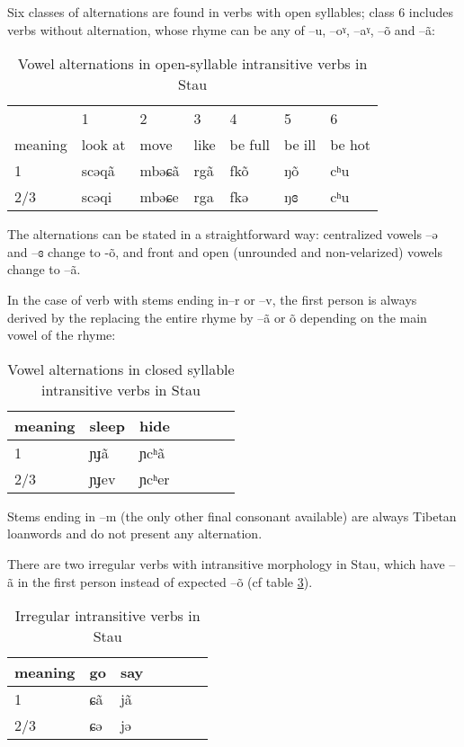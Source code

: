 \documentclass[oldfontcommands,twoside,12pt]{memoir}
\newcommand{\ipa}[1]{{\phon #1}} %
\begin{document}
 
Six classes of alternations are found in verbs with open syllables; class 6 includes verbs without alternation, whose rhyme can be any of --\ipa{u}, --\ipa{oˠ}, --\ipa{aˠ}, --\ipa{õ} and --\ipa{ã}:

\begin{table}[H]
 \label{tab:open.intr} \centering
\begin{tabular}{llll|ll|l}
\toprule
&1&2&3&4&5&6 \\
meaning &	look at   &  	move   &  	like&  	be full     &  	 	be ill      &  	be hot       \\  
\midrule
1&	\ipa{scəqã} & 	\ipa{mbəɕã} & \ipa{rgã} &	\ipa{fkõ} & 	  	\ipa{ŋõ} & 	   	\ipa{cʰu}   \\ 
2/3&	\ipa{scəqi} & 	\ipa{mbəɕe} & \ipa{rga} & 	\ipa{fkə} & 	  	\ipa{ŋɞ} & 	 	\ipa{cʰu}  \\ 
\bottomrule
\end{tabular}
\caption{Vowel alternations in open-syllable intransitive verbs in Stau}  
\end{table}

The alternations can be stated in a straightforward way: centralized vowels  --\ipa{ə} and  --\ipa{ɞ} change to -\ipa{õ}, and front and open (unrounded and non-velarized) vowels change to --\ipa{ã}.

In the case of verb with stems ending in--\ipa{r} or --\ipa{v}, the first person is always derived by the replacing the entire rhyme by --\ipa{ã} or \ipa{õ} depending on the main vowel of the rhyme:
\begin{table}[H]
\centering
\begin{tabular}{llll|ll|l}
\toprule
meaning &	sleep   &  	hide   \\  
\midrule
1&	\ipa{ɲɟã} & 	\ipa{ɲcʰã} \\ 
2/3&	\ipa{ɲɟev} & 	\ipa{ɲcʰer} \\ 
\bottomrule
\end{tabular}
\caption{Vowel alternations in closed syllable intransitive verbs in Stau} \label{tab:close.intr}
\end{table}

Stems ending in --\ipa{m} (the only other final consonant available) are always Tibetan loanwords and do not present any alternation.


There are two irregular verbs with intransitive morphology in Stau, which have \ipa{--ã} in the first person instead of expected \ipa{--õ} (cf table \ref{tab:irr.intr}). 

\begin{table}[H]
\centering 
\begin{tabular}{lllllll}
\toprule
meaning &	go     & say \\  
\midrule
1&	\ipa{ɕã}  	 &\ipa{jã}\\ 
2/3&	\ipa{ɕə} & 	\ipa{jə} &\\ 
\bottomrule
\end{tabular}
\caption{Irregular intransitive verbs in Stau}  \label{tab:irr.intr} 
\end{table}
\end{document}
